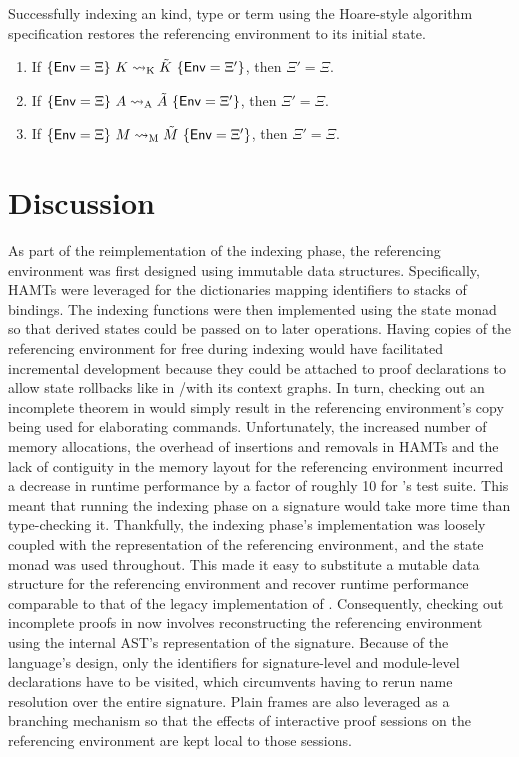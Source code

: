 \begin{corollary}
Successfully indexing an \LF kind, type or term using the Hoare-style algorithm specification restores the referencing environment to its initial state.
\begin{enumerate}
\item If $\{\mathsf{Env} = \Xi\}\ K \rightsquigarrow_{{\normalfont\text{K}}} \tilde K\ \{\mathsf{Env} = \Xi'\}$, then $\Xi' = \Xi$.
\item If $\{\mathsf{Env} = \Xi\}\ A \rightsquigarrow_{{\normalfont\text{A}}} \tilde A\ \{\mathsf{Env} = \Xi'\}$, then $\Xi' = \Xi$.
\item If $\{\mathsf{Env} = \Xi\}\ M \rightsquigarrow_{{\normalfont\text{M}}} \tilde M\ \{\mathsf{Env} = \Xi'\}$, then $\Xi' = \Xi$.
\end{enumerate}
\end{corollary}

\section{Discussion}

As part of the reimplementation of the indexing phase, the referencing environment was first designed using immutable data structures.
Specifically, \acp{HAMT} were leveraged for the dictionaries mapping identifiers to stacks of bindings.
The indexing functions were then implemented using the state monad so that derived states could be passed on to later operations.
Having copies of the referencing environment for free during indexing would have facilitated incremental development because they could be attached to proof declarations to allow state rollbacks like in \Isabelle/\Isar with its context graphs.
In turn, checking out an incomplete theorem in \Harpoon would simply result in the referencing environment's copy being used for elaborating commands.
Unfortunately, the increased number of memory allocations, the overhead of insertions and removals in \acp{HAMT} and the lack of contiguity in the memory layout for the referencing environment incurred a decrease in runtime performance by a factor of roughly 10 for \Beluga's test suite.
This meant that running the indexing phase on a signature would take more time than type-checking it.
Thankfully, the indexing phase's implementation was loosely coupled with the representation of the referencing environment, and the state monad was used throughout.
This made it easy to substitute a mutable data structure for the referencing environment and recover runtime performance comparable to that of the legacy implementation of \Beluga.
Consequently, checking out incomplete proofs in \Harpoon now involves reconstructing the referencing environment using the internal \ac{AST}'s representation of the signature.
Because of the language's design, only the identifiers for signature-level and module-level declarations have to be visited, which circumvents having to rerun name resolution over the entire signature.
Plain frames are also leveraged as a branching mechanism so that the effects of interactive proof sessions on the referencing environment are kept local to those sessions.

